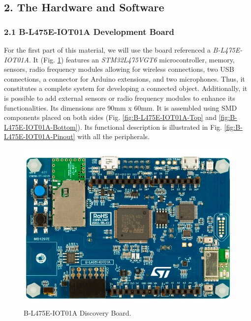 \documentclass[10pt,a4paper,onecolumn]{article}
\begin{document}
\hypertarget{the-hardware-and-software}{%
\subsection{2. The Hardware and
Software}\label{the-hardware-and-software}}

\hypertarget{b-l475e-iot01a-development-board}{%
\subsubsection{2.1 B-L475E-IOT01A Development
Board}\label{b-l475e-iot01a-development-board}}

For the first part of this material, we will use the board referenced a \textit{B-L475E-IOT01A}. It (Fig. \ref{fig:B-L475E-IOT01A-Board}) features an \textit{STM32L475VGT6} microcontroller, memory, sensors, radio frequency modules allowing for wireless connections, two USB connections, a connector for Arduino extensions, and two microphones. Thus, it constitutes a complete system for developing a connected object. Additionally, it is possible to add external sensors or radio frequency modules to enhance its functionalities. Its dimensions are 90mm x 60mm. It is assembled using SMD components placed on both sides (Fig. \ref{fig:B-L475E-IOT01A-Top} and \ref{fig:B-L475E-IOT01A-Bottom}). Its functional description is illustrated in Fig. \ref{fig:B-L475E-IOT01A-Pinout} with all the peripherals.

\begin{figure}[H]
  \centering
  \includegraphics[width=\dimexpr\textwidth-1cm\relax,height=\dimexpr0.25\textheight-1cm\relax,keepaspectratio]{images/board.png}
  \caption{B-L475E-IOT01A Discovery Board.}
  \label{fig:B-L475E-IOT01A-Board}
\end{figure}
\end{document}
